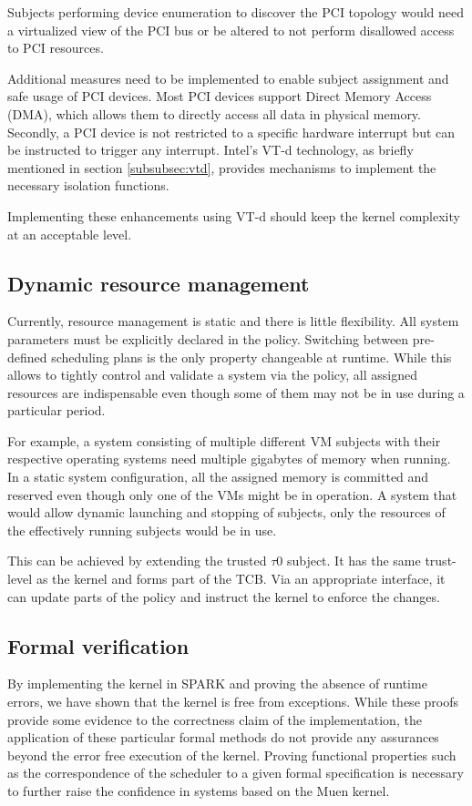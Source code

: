 Subjects performing device enumeration to discover the PCI topology would need
a virtualized view of the PCI bus or be altered to not perform disallowed access
to PCI resources.

Additional measures need to be implemented to enable subject assignment and safe
usage of PCI devices. Most PCI devices support Direct Memory Access (DMA), which
allows them to directly access all data in physical memory. Secondly, a PCI
device is not restricted to a specific hardware interrupt but can be instructed
to trigger any interrupt. Intel's VT-d technology, as briefly mentioned in
section \ref{subsubsec:vtd}, provides mechanisms to implement the necessary
isolation functions.

Implementing these enhancements using VT-d should keep the kernel complexity at
an acceptable level.

\subsection{Dynamic resource management}
Currently, resource management is static and there is little flexibility. All
system parameters must be explicitly declared in the policy. Switching between
pre-defined scheduling plans is the only property changeable at runtime. While
this allows to tightly control and validate a system via the policy, all
assigned resources are indispensable even though some of them may not be in use
during a particular period.

For example, a system consisting of multiple different VM subjects with their
respective operating systems need multiple gigabytes of memory when running.
In a static system configuration, all the assigned memory is committed and
reserved even though only one of the VMs might be in operation. A system that
would allow dynamic launching and stopping of subjects, only the resources of
the effectively running subjects would be in use.

This can be achieved by extending the trusted $\tau$0 subject. It has the same
trust-level as the kernel and forms part of the TCB. Via an appropriate
interface, it can update parts of the policy and instruct the kernel to enforce
the changes.

\subsection{Formal verification}
By implementing the kernel in SPARK and proving the absence of runtime errors,
we have shown that the kernel is free from exceptions. While these proofs
provide some evidence to the correctness claim of the implementation, the
application of these particular formal methods do not provide any assurances
beyond the error free execution of the kernel. Proving functional properties
such as the correspondence of the scheduler to a given formal specification is
necessary to further raise the confidence in systems based on the Muen kernel.

